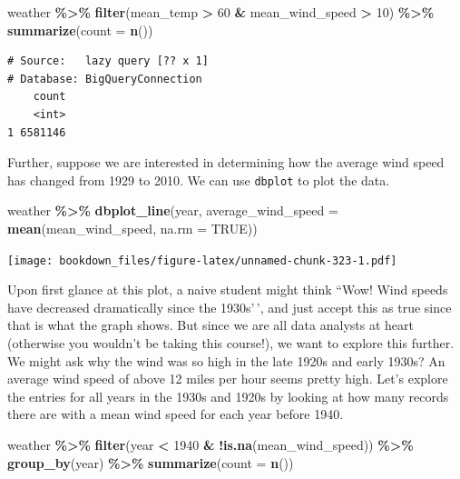 \documentclass[
]{krantz}
\makeatletter
\newenvironment{Shaded}{\begin{snugshade}}{\end{snugshade}}
\newcommand{\DataTypeTok}[1]{\textcolor[rgb]{0.27,0.27,0.27}{#1}}
\newcommand{\DecValTok}[1]{\textcolor[rgb]{0.06,0.06,0.06}{#1}}
\newcommand{\KeywordTok}[1]{\textcolor[rgb]{0.27,0.27,0.27}{\textbf{#1}}}
\newcommand{\NormalTok}[1]{#1}
\newcommand{\OperatorTok}[1]{\textcolor[rgb]{0.43,0.43,0.43}{\textbf{#1}}}
\newcommand{\OtherTok}[1]{\textcolor[rgb]{0.37,0.37,0.37}{#1}}
\newcommand{\StringTok}[1]{\textcolor[rgb]{0.5,0.5,0.5}{#1}}
\newenvironment{kframe}{%
\medskip{}
\setlength{\fboxsep}{.8em}
 \def\at@end@of@kframe{}%
 \ifinner\ifhmode%
  \def\at@end@of@kframe{\end{minipage}}%
  \begin{minipage}{\columnwidth}%
 \fi\fi%
 \def\FrameCommand##1{\hskip\@totalleftmargin \hskip-\fboxsep
 \colorbox{shadecolor}{##1}\hskip-\fboxsep
     \hskip-\linewidth \hskip-\@totalleftmargin \hskip\columnwidth}%
 \MakeFramed {\advance\hsize-\width
   \@totalleftmargin\z@ \linewidth\hsize
   \@setminipage}}%
 {\par\unskip\endMakeFramed%
 \at@end@of@kframe}
\renewenvironment{Shaded}{\begin{kframe}}{\end{kframe}}
\makeatother
\begin{document}
\begin{Shaded}
\begin{Highlighting}[]
\NormalTok{weather }\OperatorTok{\%\textgreater{}\%}
\StringTok{  }\KeywordTok{filter}\NormalTok{(mean\_temp }\OperatorTok{\textgreater{}}\StringTok{ }\DecValTok{60} \OperatorTok{\&}\StringTok{ }\NormalTok{mean\_wind\_speed }\OperatorTok{\textgreater{}}\StringTok{ }\DecValTok{10}\NormalTok{) }\OperatorTok{\%\textgreater{}\%}
\StringTok{  }\KeywordTok{summarize}\NormalTok{(}\DataTypeTok{count =} \KeywordTok{n}\NormalTok{())}
\end{Highlighting}
\end{Shaded}

\begin{verbatim}
# Source:   lazy query [?? x 1]
# Database: BigQueryConnection
    count
    <int>
1 6581146
\end{verbatim}

Further, suppose we are interested in determining how the average wind speed has changed from 1929 to 2010. We can use \texttt{dbplot} to plot the data.

\begin{Shaded}
\begin{Highlighting}[]
\NormalTok{weather }\OperatorTok{\%\textgreater{}\%}
\StringTok{  }\KeywordTok{dbplot\_line}\NormalTok{(year, }\DataTypeTok{average\_wind\_speed =} \KeywordTok{mean}\NormalTok{(mean\_wind\_speed, }\DataTypeTok{na.rm =} \OtherTok{TRUE}\NormalTok{))}
\end{Highlighting}
\end{Shaded}

\texttt{[image: bookdown\_files/figure-latex/unnamed-chunk-323-1.pdf]}

Upon first glance at this plot, a naive student might think ``Wow! Wind speeds have decreased dramatically since the 1930s'\,', and just accept this as true since that is what the graph shows. But since we are all data analysts at heart (otherwise you wouldn't be taking this course!), we want to explore this further. We might ask why the wind was so high in the late 1920s and early 1930s? An average wind speed of above 12 miles per hour seems pretty high. Let's explore the entries for all years in the 1930s and 1920s by looking at how many records there are with a mean wind speed for each year before 1940.

\begin{Shaded}
\begin{Highlighting}[]
\NormalTok{weather }\OperatorTok{\%\textgreater{}\%}
\StringTok{  }\KeywordTok{filter}\NormalTok{(year }\OperatorTok{\textless{}}\StringTok{ }\DecValTok{1940} \OperatorTok{\&}\StringTok{ }\OperatorTok{!}\KeywordTok{is.na}\NormalTok{(mean\_wind\_speed)) }\OperatorTok{\%\textgreater{}\%}
\StringTok{  }\KeywordTok{group\_by}\NormalTok{(year) }\OperatorTok{\%\textgreater{}\%}
\StringTok{  }\KeywordTok{summarize}\NormalTok{(}\DataTypeTok{count =} \KeywordTok{n}\NormalTok{())}
\end{Highlighting}
\end{Shaded}
\end{document}
